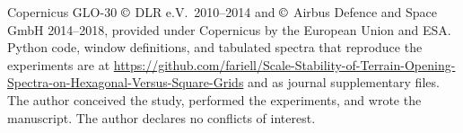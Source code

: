 \documentclass[journal]{IEEEtran}
\newif\ifhighlight
\newcommand{\rev}[1]{\ifhighlight\textcolor{blue}{#1}\else#1\fi}
\begin{document}
Copernicus GLO-30 \(\copyright\) DLR e.V.\ 2010--2014 and \(\copyright\)
Airbus Defence and Space GmbH 2014--2018, provided under Copernicus by
the European Union and ESA.
\rev{Python code, window definitions, and tabulated spectra that reproduce the
experiments are at
\url{https://github.com/fariell/Scale-Stability-of-Terrain-Opening-Spectra-on-Hexagonal-Versus-Square-Grids}
and as journal supplementary files.}
The author conceived the study, performed the experiments, and wrote the
manuscript. The author declares no conflicts of interest.



\end{document}

